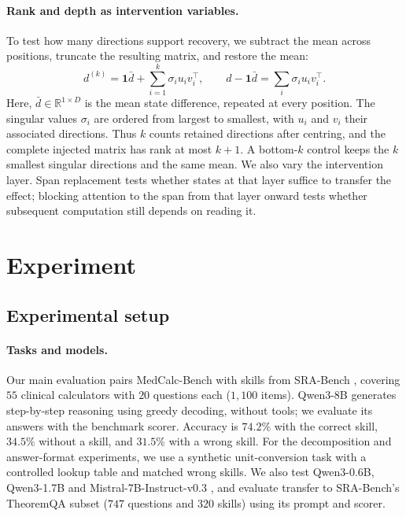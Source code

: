 \documentclass{article}
\newcommand{\dvec}{\ensuremath{d}}
\begin{document}
\paragraph{Rank and depth as intervention variables.}
To test how many directions support recovery, we subtract the mean across
positions, truncate the resulting matrix, and restore the mean:
\begin{equation}
\dvec^{(k)}=\mathbf{1}\bar{\dvec}+\sum_{i=1}^{k}\sigma_i u_i v_i^\top,
\qquad
\dvec-\mathbf{1}\bar{\dvec}=\sum_i\sigma_i u_i v_i^\top.
\label{eq:rank}
\end{equation}
Here, $\bar{\dvec}\in\mathbb{R}^{1\times D}$ is the mean state difference,
repeated at every position. The singular values $\sigma_i$ are ordered from
largest to smallest, with $u_i$ and $v_i$ their associated directions. Thus $k$
counts retained directions after centring, and the complete injected matrix has
rank at most $k+1$. A bottom-$k$ control keeps the $k$ smallest singular
directions and the same mean. We also vary the intervention layer. Span
replacement tests whether states at that layer suffice to transfer the effect;
blocking attention to the span from that layer onward tests whether subsequent
computation still depends on reading it.

\section{Experiment}
\label{sec:experiments}

\subsection{Experimental setup}
\label{sec:setup}
\label{sec:cells}

\paragraph{Tasks and models.}
Our main evaluation pairs MedCalc-Bench \citep{khandekar2024medcalc} with
skills from SRA-Bench \citep{su2026srabench}, covering $55$ clinical calculators
with $20$ questions each ($1{,}100$ items). Qwen3-8B \citep{yang2025qwen3}
generates step-by-step reasoning using greedy decoding, without tools; we
evaluate its answers with the benchmark scorer. Accuracy is $74.2\%$ with the
correct skill, $34.5\%$ without a skill, and $31.5\%$ with a wrong skill.
For the decomposition and answer-format experiments, we use a synthetic
unit-conversion task with a controlled lookup table and matched wrong skills.
We also test Qwen3-0.6B, Qwen3-1.7B and Mistral-7B-Instruct-v0.3
\citep{jiang2023mistral}, and evaluate transfer to SRA-Bench's TheoremQA subset
($747$ questions and $320$ skills) using its prompt and scorer.
\end{document}

